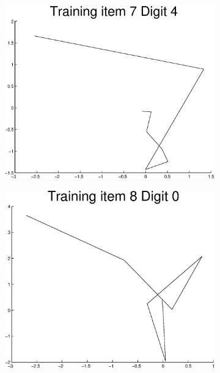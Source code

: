 \documentclass{article}
\begin{document}
	\begin{figure}[H]
	  \begin{subfigure}
	    \centering
	    \includegraphics[scale=0.4]{task1-transformed-digit-7.eps}
	  \end{subfigure}
	  \begin{subfigure}
	    \centering
	    \includegraphics[scale=0.4]{task1-transformed-digit-8.eps}
	  \end{subfigure}
	\end{figure}
        
\end{document}
